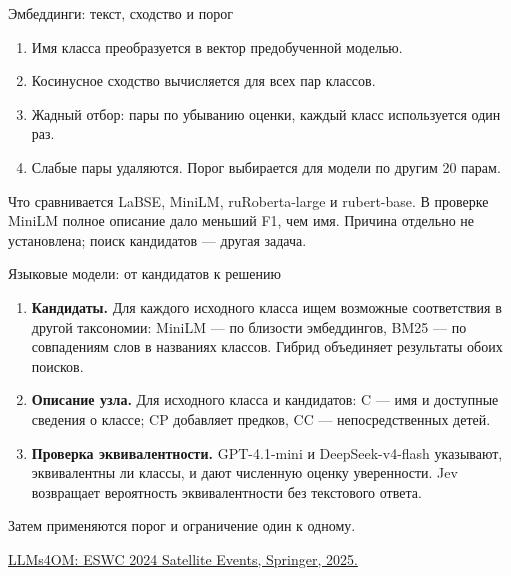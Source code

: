 \documentclass[aspectratio=169,11pt]{beamer}
\begin{document}
\renewcommand{\hseheadertext}{Часть I. Сопоставление таксономий}
\begin{frame}{Эмбеддинги: текст, сходство и порог}
  \begin{enumerate}
    \item Имя класса преобразуется в вектор предобученной моделью.
    \item Косинусное сходство вычисляется для всех пар классов.
    \item Жадный отбор: пары по убыванию оценки, каждый класс используется один раз.
    \item Слабые пары удаляются. Порог выбирается для модели по другим 20 парам.
  \end{enumerate}
  \begin{block}{Что сравнивается}
    LaBSE, MiniLM, ruRoberta-large и rubert-base.
    В проверке MiniLM полное описание дало меньший F1, чем имя.
    Причина отдельно не установлена; поиск кандидатов — другая задача.
  \end{block}
\end{frame}

\renewcommand{\hseheadertext}{Часть I. Сопоставление таксономий}
\begin{frame}{Языковые модели: от кандидатов к решению}
  \begin{enumerate}
    \item \textbf{Кандидаты.} Для каждого исходного класса ищем возможные
      соответствия в другой таксономии: MiniLM — по близости эмбеддингов,
      BM25 — по совпадениям слов в названиях классов.
      Гибрид объединяет результаты обоих поисков.
    \item \textbf{Описание узла.} Для исходного класса и кандидатов:
      C — имя и доступные сведения о классе; CP добавляет предков,
      CC — непосредственных детей.
    \item \textbf{Проверка эквивалентности.} GPT-4.1-mini и DeepSeek-v4-flash
      указывают, эквивалентны ли классы, и дают численную оценку уверенности.
      Jev возвращает вероятность эквивалентности без текстового ответа.
  \end{enumerate}
  Затем применяются порог и ограничение один к одному.
  \medskip

  {\fontsize{9}{11}\selectfont
    \href{https://doi.org/10.1007/978-3-031-78952-6_3}{LLMs4OM: ESWC 2024 Satellite Events, Springer, 2025.}}
\end{frame}
\end{document}
